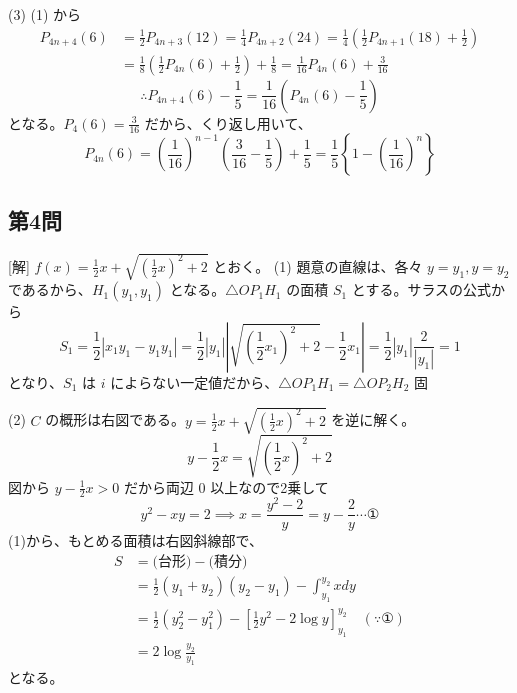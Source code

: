 \documentclass[../main.tex]{subfiles}
\begin{document}
(3) (1) から
\begin{align*}
  P_{4n+4}(6) &= \frac{1}{2} P_{4n+3}(12) = \frac{1}{4} P_{4n+2}(24) = \frac{1}{4}\left(\frac{1}{2} P_{4n+1}(18) + \frac{1}{2}\right) \\
  &= \frac{1}{8} \left(\frac{1}{2} P_{4n}(6) + \frac{1}{2}\right) + \frac{1}{8} = \frac{1}{16} P_{4n}(6) + \frac{3}{16}
\end{align*}
\[ \therefore P_{4n+4}(6) - \frac{1}{5} = \frac{1}{16} \left(P_{4n}(6) - \frac{1}{5}\right) \]
となる。$P_4(6) = \frac{3}{16}$ だから、くり返し用いて、
\[ P_{4n}(6) = \left(\frac{1}{16}\right)^{n-1} \left(\frac{3}{16} - \frac{1}{5}\right) + \frac{1}{5} = \frac{1}{5} \left\{ 1 - \left(\frac{1}{16}\right)^n \right\} \]

\subsection*{第4問}
[解] $f(x) = \frac{1}{2}x + \sqrt{\left(\frac{1}{2}x\right)^2 + 2}$ とおく。
(1) 題意の直線は、各々 $y=y_1, y=y_2$ であるから、$H_1(y_1, y_1)$ となる。$\triangle OP_1 H_1$ の面積 $S_1$ とする。サラスの公式から
\[ S_1 = \frac{1}{2} | x_1 y_1 - y_1 y_1 | = \frac{1}{2} | y_1 | \left| \sqrt{\left(\frac{1}{2}x_1\right)^2+2} - \frac{1}{2}x_1 \right| = \frac{1}{2} | y_1 | \frac{2}{|y_1|} = 1 \]
となり、$S_1$ は $i$ によらない一定値だから、$\triangle OP_1 H_1 = \triangle OP_2 H_2$ 固

(2) $C$ の概形は右図である。$y = \frac{1}{2}x + \sqrt{\left(\frac{1}{2}x\right)^2 + 2}$ を逆に解く。
\[ y - \frac{1}{2}x = \sqrt{\left(\frac{1}{2}x\right)^2 + 2} \]
図から $y - \frac{1}{2}x > 0$ だから両辺 $0$ 以上なので2乗して
\[ y^2 - xy = 2 \implies x = \frac{y^2 - 2}{y} = y - \frac{2}{y} \cdots \text{①} \]
(1)から、もとめる面積は右図斜線部で、
\begin{align*}
  S &= \text{(台形)} - \text{(積分)} \\
  &= \frac{1}{2}(y_1 + y_2)(y_2 - y_1) - \int_{y_1}^{y_2} x dy \\
  &= \frac{1}{2}(y_2^2 - y_1^2) - \left[ \frac{1}{2}y^2 - 2\log y \right]_{y_1}^{y_2} \quad (\because \text{①}) \\
  &= 2\log\frac{y_2}{y_1}
\end{align*}
となる。
\end{document}
